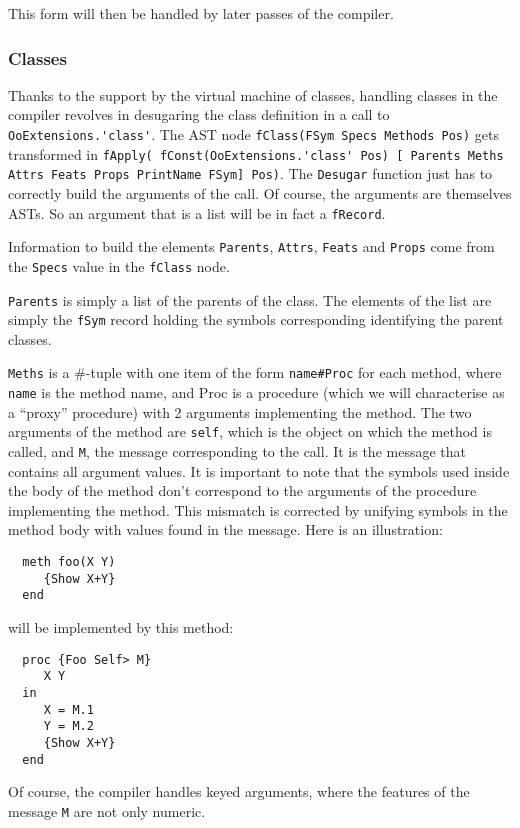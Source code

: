 \documentclass[a4paper]{memoir}
\begin{document}
This form will then be handled by later passes of the compiler.
\subsubsection{Classes}\label{sec:arch:desugar:classes}
Thanks to the support by the virtual machine of classes, handling classes in the
compiler revolves in desugaring the class definition in a call to
\lstinline!OoExtensions.'class'!. 
The AST node \lstinline!fClass(FSym Specs Methods Pos)! gets transformed in 
\lstinline!fApply( fConst(OoExtensions.'class' Pos) [ Parents Meths Attrs Feats Props PrintName FSym] Pos)!.
The \lstinline!Desugar! function just has to correctly build the arguments of
the call. Of course, the arguments are themselves ASTs. So an argument that is a
list will be in fact a \lstinline!fRecord!.

Information to build the elements \lstinline!Parents!, \lstinline!Attrs!,
\lstinline!Feats! and \lstinline!Props! come from the \lstinline!Specs! value in
the \lstinline!fClass! node.

\lstinline!Parents! is simply a list of the parents of the class. The elements
of the list are simply the \lstinline!fSym! record holding the symbols
corresponding identifying the parent classes.


\lstinline!Meths! is a \#-tuple with one item of the form \lstinline!name#Proc! for each
method, where \lstinline!name! is the method name, and Proc is a procedure
(which we will characterise as a ``proxy'' procedure) with
2 arguments implementing the method. The two arguments of the method are
\lstinline!self!,
which is the object on which the method is called, and \lstinline!M!, the message
corresponding to the call. It is the message that contains all argument values.
It is important to note that the symbols used inside the body of the method
don't correspond to the arguments of the procedure implementing the method.
This mismatch is corrected by unifying symbols in the method body with values
found in the message. Here is an illustration:
\begin{lstlisting}
  meth foo(X Y)
     {Show X+Y}
  end 
\end{lstlisting}
will be implemented by this method:
\begin{lstlisting}
  proc {Foo Self> M}
     X Y
  in
     X = M.1
     Y = M.2
     {Show X+Y}
  end  
\end{lstlisting}
Of course, the compiler handles keyed arguments, where the features of the
message \lstinline!M! are not only numeric.
\end{document}
